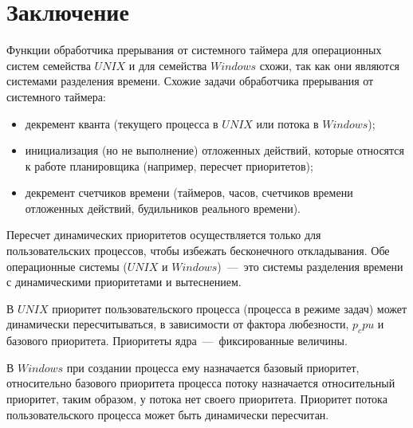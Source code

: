 \chapter*{Заключение}

Функции обработчика прерывания от системного таймера для операционных систем семейства $UNIX$ и для семейства $Windows$ схожи, так как они являются системами разделения времени. Схожие задачи обработчика прерывания от системного таймера:
\begin{itemize}[label*=---]
	\item декремент кванта (текущего процесса в $UNIX$ или потока в $Windows$);
	\item инициализация (но не выполнение) отложенных действий, которые относятся к работе планировщика (например, пересчет приоритетов);
	\item декремент счетчиков времени (таймеров, часов, счетчиков времени отложенных действий, будильников реального времени).
\end{itemize}

Пересчет динамических приоритетов осуществляется только для пользовательских процессов, чтобы избежать бесконечного откладывания.  Обе операционные системы ($UNIX$ и $Windows$)~---~это системы разделения времени с динамическими приоритетами и вытеснением.

В $UNIX$ приоритет пользовательского процесса (процесса в режиме задач) может динамически пересчитываться, в зависимости от фактора любезности, $p_cpu$ и базового приоритета. Приоритеты ядра~---~фиксированные величины.

В $Windows$ при создании процесса ему назначается базовый приоритет, относительно базового приоритета процесса потоку назначается относительный приоритет, таким образом, у потока нет своего приоритета. Приоритет потока пользовательского процесса может быть динамически пересчитан.

\newpage